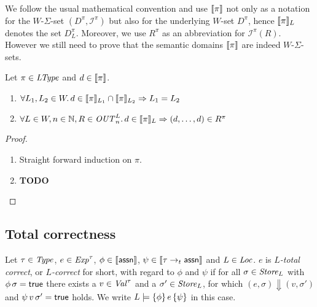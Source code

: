 \documentclass[12pt,a4paper]{report}
\newcommand{\OUT}{\nstyle{OUT}}
\newcommand{\I}{\mathcal{I}}
\begin{document}
We follow the usual mathematical convention and use $\llbracket\pi\rrbracket$ not only as a notation
for the $W$-$\Sigma$-set $(D^\pi,\I^\pi)$ but also for the underlying $W$-set $D^\pi$,
hence $\llbracket\pi\rrbracket_L$ denotes the set $D^\pi_L$. Moreover, we use $R^\pi$ as an abbreviation
for $\I^\pi(R)$. However we still need to prove that the semantic domains $\llbracket\pi\rrbracket$
are indeed $W$-$\Sigma$-sets.

\begin{lemma}
  Let $\pi\in\mathit{LType}$ and $d \in \llbracket\pi\rrbracket$.
  \begin{enumerate}
    \item $\forall L_1,L_2\in W.\, d \in \llbracket\pi\rrbracket_{L_1} \cap \llbracket\pi\rrbracket_{L_2} \Rightarrow L_1 = L_2$
    \item $\forall L \in W, n \in \N, R\in \OUT^L_n.\, d \in \semantic{\pi}_L \Rightarrow (d,\ldots,d) \in R^\pi$
  \end{enumerate}
\end{lemma}

\begin{proof} \
  \begin{enumerate}
    \item Straight forward induction on $\pi$.

    \item {\bf TODO}
  \end{enumerate}
\end{proof}



\subsection{Total correctness}

\begin{definition}
  Let $\tau\in\mathit{Type}$, $e\in\mathit{Exp}^\tau$, $\phi\in\llbracket\mathsf{assn}\rrbracket$, $\psi\in\llbracket\tau\rightarrow_t\mathsf{assn}\rrbracket$
  and $L\in\mathit{Loc}$. $e$ is {\em $L$-total correct}, or {\em $L$-correct} for short, with regard to $\phi$ and $\psi$
  if for all $\sigma\in\mathit{Store}_L$ with $\phi\,\sigma=\mathsf{true}$ there exists a $v\in\mathit{Val}^\tau$ and a $\sigma'\in\mathit{Store}_L$,
  for which $(e,\sigma) \Downarrow (v,\sigma')$ and $\psi\,v\,\sigma' = \mathsf{true}$ holds. We write
  $L \models \{\phi\}\,e\,\{\psi\}$ in this case.
\end{definition}
\end{document}
